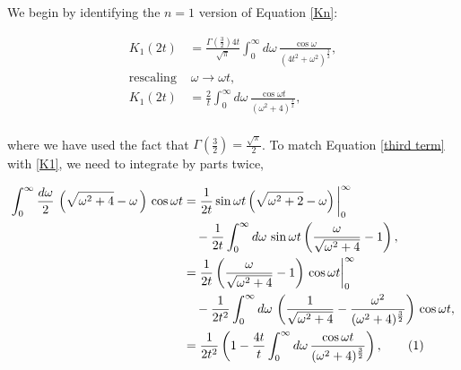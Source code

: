 \documentclass{article}
\numberwithin{equation}{section} %
\begin{document}
We begin by identifying the $n=1$ version of Equation \ref{Kn}:

\begin{equation}
\begin{split}
K_1(2t) &= \frac{\Gamma(\frac{3}{2})4t}{\sqrt{\pi}} \int^\infty_0 d\omega\, 
\frac{\cos \omega }{(4t^2 + \omega^2)^{\frac{3}{2}}},\\
\mathrm{rescaling}\,&\, \omega \rightarrow \omega t,\\
K_1(2t) &=\frac{2}{t} \int^\infty_0 d\omega\, 
\frac{\cos \omega t}{(\omega^2+4)^{\frac{3}{2}}},\\
\end{split}
\label{K1}
\end{equation}

\noindent where we have used the fact that  $\Gamma(\frac{3}{2})=\frac{\sqrt{\pi}}{2}$. To match Equation \ref{third term} with \ref{K1}, we need to integrate by parts twice,


\begin{align*}
\int^\infty_0 \frac{d\omega}{2}\, \left(\sqrt{\omega^2 + 4} - \omega\,\right)\, \cos \omega t &= \frac{1}{2t}\sin \omega t \left(\sqrt{\omega^2 +2} - \omega\right)\bigg\vert^\infty_0\\
& \quad -\frac{1}{2t}\int^\infty_0 d\omega\, \sin \omega t \left( \frac{\omega}{\sqrt{\omega^2 +4}} - 1 \right),\\
&=\frac{1}{2t}\left(\frac{\omega}{\sqrt{\omega^2+4}} -1 \right)\,\cos \omega t \bigg\vert^\infty_0 \\
 &\quad -\frac{1}{2t^2} \int^\infty_0 d\omega \, \left(\frac{1}{\sqrt{\omega^2 + 4}} - \frac{\omega^2}{(\omega^2 +4)^{\frac{3}{2}}} \right) \, \cos \omega t,\\
&=\frac{1}{2t^2} \left( 1 - \frac{4t}{t} \int^\infty_0 d\omega \, \frac{\cos \omega t}{(\omega^2 + 4)^{\frac{3}{2}}} \right),
\tag{\refstepcounter{equation}\theequation}
\end{align*}
\end{document}
